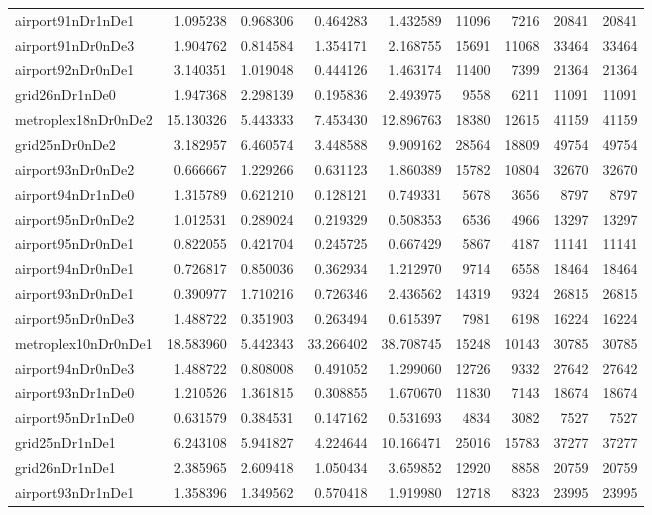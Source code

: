 \begin{longtable}{|l|r|r|r|r|r|r|r|r|}
airport91nDr1nDe1 & 1.095238 & 0.968306 & 0.464283 & 1.432589 & 11096 & 7216 & 20841 & 20841 \\
airport91nDr0nDe3 & 1.904762 & 0.814584 & 1.354171 & 2.168755 & 15691 & 11068 & 33464 & 33464 \\
airport92nDr0nDe1 & 3.140351 & 1.019048 & 0.444126 & 1.463174 & 11400 & 7399 & 21364 & 21364 \\
grid26nDr1nDe0 & 1.947368 & 2.298139 & 0.195836 & 2.493975 & 9558 & 6211 & 11091 & 11091 \\
metroplex18nDr0nDe2 & 15.130326 & 5.443333 & 7.453430 & 12.896763 & 18380 & 12615 & 41159 & 41159 \\
grid25nDr0nDe2 & 3.182957 & 6.460574 & 3.448588 & 9.909162 & 28564 & 18809 & 49754 & 49754 \\
airport93nDr0nDe2 & 0.666667 & 1.229266 & 0.631123 & 1.860389 & 15782 & 10804 & 32670 & 32670 \\
airport94nDr1nDe0 & 1.315789 & 0.621210 & 0.128121 & 0.749331 & 5678 & 3656 & 8797 & 8797 \\
airport95nDr0nDe2 & 1.012531 & 0.289024 & 0.219329 & 0.508353 & 6536 & 4966 & 13297 & 13297 \\
airport95nDr0nDe1 & 0.822055 & 0.421704 & 0.245725 & 0.667429 & 5867 & 4187 & 11141 & 11141 \\
airport94nDr0nDe1 & 0.726817 & 0.850036 & 0.362934 & 1.212970 & 9714 & 6558 & 18464 & 18464 \\
airport93nDr0nDe1 & 0.390977 & 1.710216 & 0.726346 & 2.436562 & 14319 & 9324 & 26815 & 26815 \\
airport95nDr0nDe3 & 1.488722 & 0.351903 & 0.263494 & 0.615397 & 7981 & 6198 & 16224 & 16224 \\
metroplex10nDr0nDe1 & 18.583960 & 5.442343 & 33.266402 & 38.708745 & 15248 & 10143 & 30785 & 30785 \\
airport94nDr0nDe3 & 1.488722 & 0.808008 & 0.491052 & 1.299060 & 12726 & 9332 & 27642 & 27642 \\
airport93nDr1nDe0 & 1.210526 & 1.361815 & 0.308855 & 1.670670 & 11830 & 7143 & 18674 & 18674 \\
airport95nDr1nDe0 & 0.631579 & 0.384531 & 0.147162 & 0.531693 & 4834 & 3082 & 7527 & 7527 \\
grid25nDr1nDe1 & 6.243108 & 5.941827 & 4.224644 & 10.166471 & 25016 & 15783 & 37277 & 37277 \\
grid26nDr1nDe1 & 2.385965 & 2.609418 & 1.050434 & 3.659852 & 12920 & 8858 & 20759 & 20759 \\
airport93nDr1nDe1 & 1.358396 & 1.349562 & 0.570418 & 1.919980 & 12718 & 8323 & 23995 & 23995 \\

\end{longtable}
